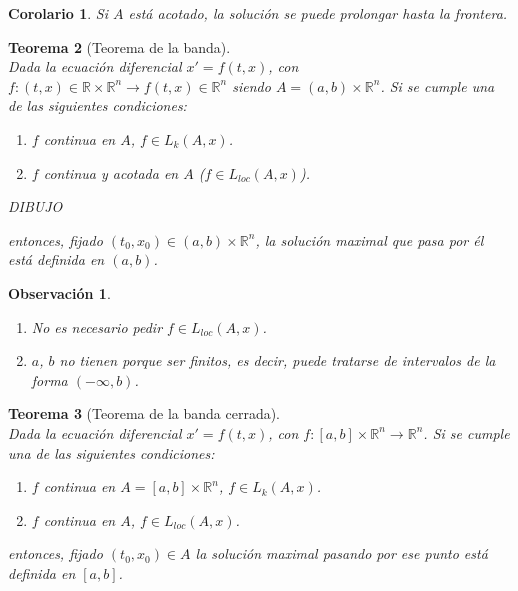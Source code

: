 \documentclass[11pt]{article}
\theoremstyle{theorem-style}  %
\newtheorem{theorem}{Teorema}[section]  %
\newtheorem{corollary}[theorem]{Corolario} %
\theoremstyle{definition-style}
\newtheorem*{observation}{Observación} %
\theoremstyle{example-style}
\begin{document}
\begin{corollary}
	Si $A$ está acotado, la solución se puede prolongar hasta la frontera.
\end{corollary}
\begin{theorem}[Teorema de la banda]\label{banda} \ \\ 
	Dada la ecuación diferencial $x' = f(t, x)$, con $f: (t, x) \in \mathbb{R} \times \mathbb{R}^n \longrightarrow f(t, x) \in \mathbb{R}^n$ siendo $A = (a, b) \times \mathbb{R}^n$. Si se cumple una de las siguientes condiciones:
	\begin{enumerate}
		\item  $f$ continua en $A$, $f \in L_k (A, x)$.
		\item  $f$ continua y acotada en $A$ ($f \in L_{loc} (A, x)$).
	\end{enumerate}
	
	DIBUJO
	
	entonces, fijado $(t_0, x_0) \in (a, b) \times \mathbb{R}^n$, la solución maximal que pasa por él está definida en $(a, b)$.
\end{theorem}
\begin{observation} \ 
	\begin{enumerate}
		\item No es necesario pedir $f \in L_{loc} (A, x)$.
		\item $a$, $b$ no tienen porque ser finitos, es decir, puede tratarse de intervalos de la forma $(- \infty, b)$.
	\end{enumerate}
\end{observation}
\begin{theorem}[Teorema de la banda cerrada] \label{bandacerrada} \ \\
	Dada la ecuación diferencial $x' = f(t, x)$, con $f: [a, b] \times \mathbb{R}^n \longrightarrow \mathbb{R}^n$. Si se cumple una de las siguientes condiciones:
	\begin{enumerate}
		\item $f$ continua en $A = [a, b] \times \mathbb{R}^n$, $f \in L_k (A, x)$.
		\item $f$ continua en $A$, $f \in L_{loc} (A, x)$.
	\end{enumerate}
	entonces, fijado $(t_0, x_0) \in A$ la solución maximal pasando por ese punto está definida en $[a, b]$. 
\end{theorem}
\end{document}

